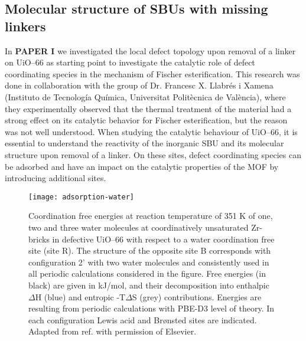 \subsection*{Molecular structure of SBUs with missing linkers}
In \textbf{PAPER I} we investigated the local defect topology upon removal of a linker on UiO--66 as starting point to investigate the catalytic role of defect coordinating species in the mechanism of Fischer esterification. This research was done in collaboration with the group of Dr. Francesc X. Llabr\'es i Xamena (Instituto de Tecnolog\'{i}a Qu\'{i}mica, Universitat Polit\`ecnica de Val\`encia), where they experimentally observed that the thermal treatment of the material had a strong effect on its catalytic behavior for Fischer esterification, but the reason was not well understood. When studying the catalytic behaviour of UiO--66, it is essential to understand the reactivity of the inorganic SBU and its molecular structure upon removal of a linker. On these sites, defect coordinating species can be adsorbed and have an impact on the catalytic properties of the MOF by introducing additional sites. 
\begin{figure}[!htbp]
	\centering
	\texttt{[image: adsorption-water]}
	\caption{Coordination free energies at reaction temperature of 351 K of one, two and three water molecules at coordinatively unsaturated Zr-bricks in defective UiO--66 with respect to a water coordination free site (site R). The structure of the opposite site B corresponds with configuration 2’ with two water molecules and consistently used in all periodic calculations considered in the figure. Free energies (in black) are given in kJ/mol, and their decomposition into enthalpic $\Delta$H (blue) and entropic -T$\Delta$S (grey) contributions. Energies are resulting from periodic calculations with PBE-D3 level of theory. In each configuration Lewis acid and Brønsted sites are indicated. Adapted from ref. \cite{caratelli2017nature} with permission of Elsevier.}
	\label{fig:adsorption-water}
\end{figure}
